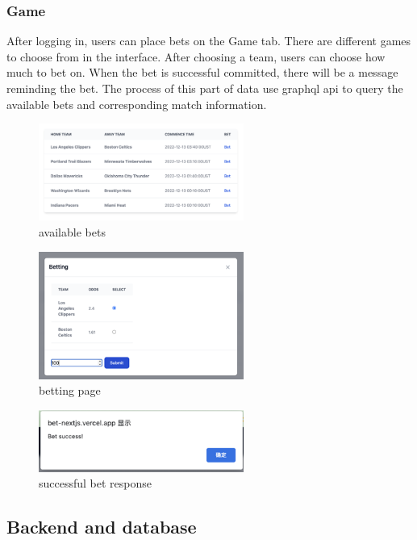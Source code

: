 \documentclass[singlecolumn]{article}
\begin{document}
\subsubsection{Game}

After logging in, users can place bets on the Game tab. There are different games to choose from in the interface. After choosing a team, users can choose how much to bet on. When the bet is successful committed, there will be a message reminding the bet. The process of this part of data use graphql api to query the available bets and corresponding match information.

\begin{figure}[H]
    \centering
    \includegraphics[width=0.6\textwidth]{bet1.png}
    \caption{available bets}
\end{figure}

\begin{figure}[H]
    \centering
    \includegraphics[width=0.6\textwidth]{bet2.png}
    \caption{betting page}
\end{figure}

\begin{figure}[H]
    \centering
    \includegraphics[width=0.6\textwidth]{bet3.png}
    \caption{successful bet response}
\end{figure}

\subsection{Backend and database}
\end{document}
